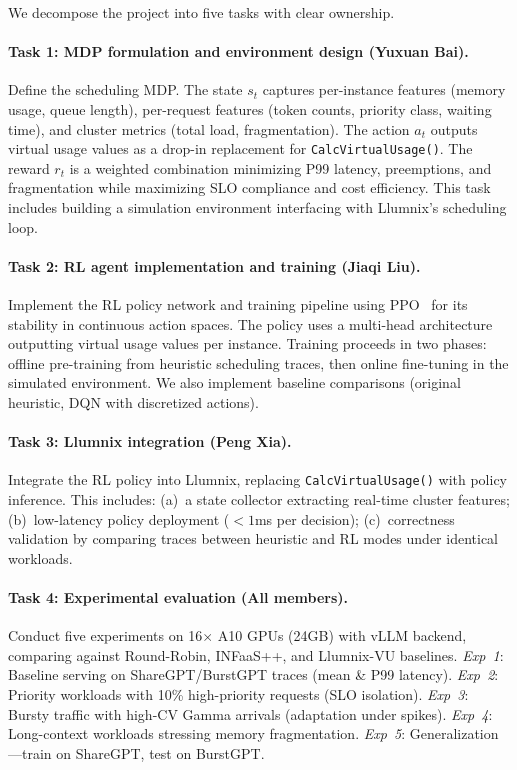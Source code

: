 \documentclass{article}
\begin{document}
We decompose the project into five tasks with clear ownership.

\paragraph{Task 1: MDP formulation and environment design \textnormal{(Yuxuan Bai).}}
Define the scheduling MDP. The state $s_t$ captures per-instance features (memory usage, queue length), per-request features (token counts, priority class, waiting time), and cluster metrics (total load, fragmentation). The action $a_t$ outputs virtual usage values as a drop-in replacement for \texttt{CalcVirtualUsage()}. The reward $r_t$ is a weighted combination minimizing P99 latency, preemptions, and fragmentation while maximizing SLO compliance and cost efficiency. This task includes building a simulation environment interfacing with Llumnix's scheduling loop.

\paragraph{Task 2: RL agent implementation and training \textnormal{(Jiaqi Liu).}}
Implement the RL policy network and training pipeline using PPO~\cite{schulman2017proximal} for its stability in continuous action spaces. The policy uses a multi-head architecture outputting virtual usage values per instance. Training proceeds in two phases: offline pre-training from heuristic scheduling traces, then online fine-tuning in the simulated environment. We also implement baseline comparisons (original heuristic, DQN with discretized actions).

\paragraph{Task 3: Llumnix integration \textnormal{(Peng Xia).}}
Integrate the RL policy into Llumnix, replacing \texttt{CalcVirtualUsage()} with policy inference. This includes: (a)~a state collector extracting real-time cluster features; (b)~low-latency policy deployment ($< 1$ms per decision); (c)~correctness validation by comparing traces between heuristic and RL modes under identical workloads.

\paragraph{Task 4: Experimental evaluation \textnormal{(All members).}}
Conduct five experiments on 16$\times$ A10 GPUs (24GB) with vLLM backend, comparing against Round-Robin, INFaaS++, and Llumnix-VU baselines.
\emph{Exp~1}: Baseline serving on ShareGPT/BurstGPT traces (mean \& P99 latency).
\emph{Exp~2}: Priority workloads with 10\% high-priority requests (SLO isolation).
\emph{Exp~3}: Bursty traffic with high-CV Gamma arrivals (adaptation under spikes).
\emph{Exp~4}: Long-context workloads stressing memory fragmentation.
\emph{Exp~5}: Generalization---train on ShareGPT, test on BurstGPT.
\end{document}
